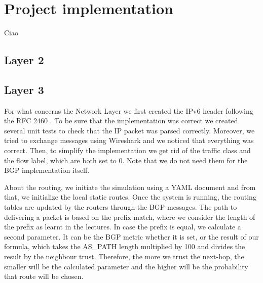 \chapter{Project implementation}
Ciao

\section{Layer 2}

\section{Layer 3}
For what concerns the Network Layer we first created the IPv6 header following the RFC 2460 \cite{rfc2460}.\newline
To be sure that the implementation was correct we created several unit tests to check that the IP packet was parsed correctly.
Moreover, we tried to exchange messages using Wireshark and we noticed that everything was correct.\newline
Then, to simplify the implementation we get rid of the traffic class and the flow label, which are both set to 0.
Note that we do not need them for the BGP implementation itself.
\par About the routing, we initiate the simulation using a YAML document and from that, we initialize the local static routes.\newline
Once the system is running, the routing tables are updated by the routers through the BGP messages.
The path to delivering a packet is based on the prefix match, where we consider the length of the prefix as learnt in the lectures.\newline
In case the prefix is equal, we calculate a second parameter.
It can be the BGP metric whether it is set, or the result of our formula, which takes the AS\_PATH length multiplied by 100 and divides the result by the neighbour trust.
Therefore, the more we trust the next-hop, the smaller will be the calculated parameter and the higher will be the probability that route will be chosen.


